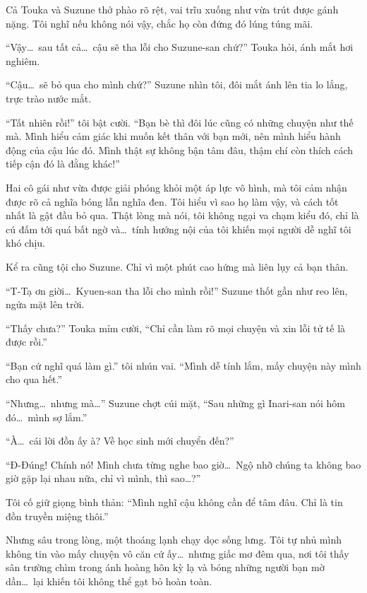 \documentclass[../main.tex]{subfiles}
\begin{document}
Cả Touka và Suzune thở phào rõ rệt, vai trĩu xuống như vừa trút được gánh nặng. Tôi nghĩ nếu không nói vậy, chắc họ còn đứng đó lúng túng mãi.

``Vậy\dots\ sau tất cả\dots\ cậu sẽ tha lỗi cho Suzune-san chứ?'' Touka hỏi, ánh mắt hơi nghiêm.

``Cậu\dots\ sẽ bỏ qua cho mình chứ?'' Suzune nhìn tôi, đôi mắt ánh lên tia lo lắng, trực trào nước mắt.

``Tất nhiên rồi!'' tôi bật cười. ``Bạn bè thì đôi lúc cũng có những chuyện như thế mà. Mình hiểu cảm giác khi muốn kết thân với bạn mới, nên mình hiểu hành động của cậu lúc đó. Mình thật sự không bận tâm đâu, thậm chí còn thích cách tiếp cận đó là đằng khác!''

Hai cô gái như vừa được giải phóng khỏi một áp lực vô hình, mà tôi cảm nhận được rõ cả nghĩa bóng lẫn nghĩa đen. Tôi hiểu vì sao họ làm vậy, và cách tốt nhất là gật đầu bỏ qua. Thật lòng mà nói, tôi không ngại va chạm kiểu đó, chỉ là cú đấm tới quá bất ngờ và\dots\ tính hướng nội của tôi khiến mọi người dễ nghĩ tôi khó chịu.

Kể ra cũng tội cho Suzune. Chỉ vì một phút cao hứng mà liên lụy cả bạn thân.

``T-Tạ ơn giời\dots\ Kyuen-san tha lỗi cho mình rồi!'' Suzune thốt gần như reo lên, ngửa mặt lên trời.


``Thấy chưa?'' Touka mỉm cười, ``Chỉ cần làm rõ mọi chuyện và xin lỗi tử tế là được rồi.''

``Bạn cứ nghĩ quá làm gì.'' tôi nhún vai. ``Mình dễ tính lắm, mấy chuyện này mình cho qua hết.''

``Nhưng\dots\ nhưng mà\dots'' Suzune chợt cúi mặt, ``Sau những gì Inari-san nói hôm đó\dots\ mình sợ lắm.''

``À\dots\ cái lời đồn ấy à? Về học sinh mới chuyển đến?''

``Đ-Đúng! Chính nó! Mình chưa từng nghe bao giờ\dots\ Ngộ nhỡ chúng ta không bao giờ gặp lại nhau nữa, chỉ vì mình, thì sao\dots?''

Tôi cố giữ giọng bình thản: ``Mình nghĩ cậu không cần để tâm đâu. Chỉ là tin đồn truyền miệng thôi.''

Nhưng sâu trong lòng, một thoáng lạnh chạy dọc sống lưng. Tôi tự nhủ mình không tin vào mấy chuyện vô căn cứ ấy\dots\ nhưng giấc mơ đêm qua, nơi tôi thấy sân trường chìm trong ánh hoàng hôn kỳ lạ và bóng những người bạn mờ dần\dots\ lại khiến tôi không thể gạt bỏ hoàn toàn.
\end{document}
